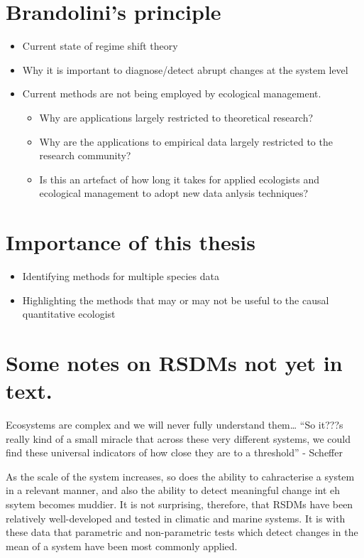 \documentclass[12pt,twoside,openany]{reedthesis}
\providecommand{\tightlist}{%
  \setlength{\itemsep}{0pt}\setlength{\parskip}{0pt}}
\begin{document}
\section{Brandolini's principle}\label{brandolinis-principle}
\begin{itemize}
\tightlist
\item
  Current state of regime shift theory
\item
  Why it is important to diagnose/detect abrupt changes at the system
  level
\item
  Current methods are not being employed by ecological management.
  \begin{itemize}
  \tightlist
  \item
    Why are applications largely restricted to theoretical research?
  \item
    Why are the applications to empirical data largely restricted to the
    research community?
  \item
    Is this an artefact of how long it takes for applied ecologists and
    ecological management to adopt new data anlysis techniques?
  \end{itemize}
\end{itemize}
\section{Importance of this thesis}\label{importance-of-this-thesis}
\begin{itemize}
\tightlist
\item
  Identifying methods for multiple species data
\item
  Highlighting the methods that may or may not be useful to the causal
  quantitative ecologist
\end{itemize}
\section{Some notes on RSDMs not yet in
text.}\label{some-notes-on-rsdms-not-yet-in-text.}

Ecosystems are complex and we will never fully understand them\ldots{}
``So it???s really kind of a small miracle that across these very
different systems, we could find these universal indicators of how close
they are to a threshold'' - Scheffer

As the scale of the system increases, so does the ability to
cahracterise a system in a relevant manner, and also the ability to
detect meaningful change int eh ssytem becomes muddier. It is not
surprising, therefore, that RSDMs have been relatively well-developed
and tested in climatic and marine systems. It is with these data that
parametric and non-parametric tests which detect changes in the mean of
a system have been most commonly applied.
\end{document}
